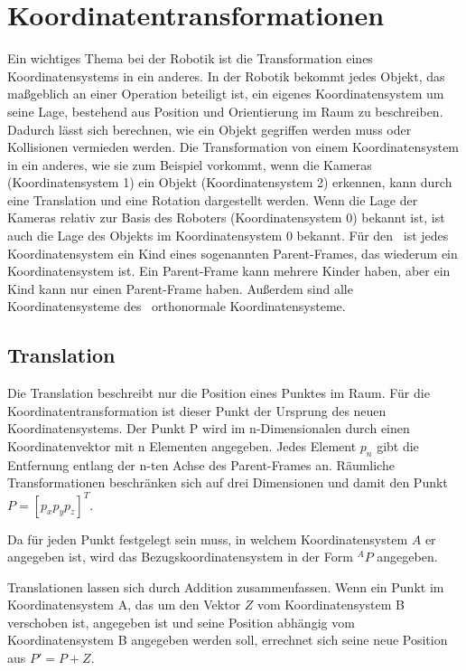 \section{Koordinatentransformationen}

Ein wichtiges Thema bei der Robotik ist die Transformation eines 
Koordinatensystems in ein anderes. In der Robotik bekommt jedes
Objekt, das maßgeblich an einer Operation beteiligt ist, ein eigenes
Koordinatensystem um seine Lage, bestehend aus Position und Orientierung
im Raum zu beschreiben. Dadurch lässt sich berechnen, wie ein Objekt gegriffen
werden muss oder Kollisionen vermieden werden. Die Transformation von einem 
Koordinatensystem in ein anderes, wie sie zum Beispiel vorkommt, wenn die 
Kameras (Koordinatensystem 1) ein Objekt (Koordinatensystem 2) erkennen, kann
durch eine Translation und eine Rotation dargestellt werden. Wenn die Lage der
Kameras relativ zur Basis des Roboters (Koordinatensystem 0) bekannt ist, ist
auch die Lage des Objekts im Koordinatensystem 0 bekannt. Für den \cob\ ist 
jedes Koordinatensystem ein Kind eines sogenannten Parent-Frames, das wiederum 
ein Koordinatensystem ist. Ein Parent-Frame kann mehrere Kinder haben, aber ein
Kind kann nur einen Parent-Frame haben. Außerdem sind alle Koordinatensysteme
des \cob\ orthonormale Koordinatensysteme. 

\subsection{Translation}
\label{sub:Translation}


Die Translation beschreibt nur die Position eines Punktes im Raum. Für die 
Koordinatentransformation ist dieser Punkt der Ursprung des neuen Koordinatensystems.
Der Punkt P wird im n-Dimensionalen durch einen Koordinatenvektor mit n 
Elementen angegeben. Jedes Element $p_n$ gibt die Entfernung
entlang der n-ten Achse des Parent-Frames an. Räumliche Transformationen beschränken sich auf drei Dimensionen
und damit den Punkt $P= [p_x p_y p_z]^T$.

Da für jeden Punkt festgelegt sein muss, in welchem Koordinatensystem $A$ er angegeben
ist, wird das Bezugskoordinatensystem in der Form $^AP$ angegeben.

Translationen lassen sich durch Addition zusammenfassen. Wenn ein Punkt im 
Koordinatensystem A, das um den Vektor $Z$ vom Koordinatensystem B verschoben ist,
angegeben
ist und seine Position abhängig vom Koordinatensystem B angegeben werden soll,
errechnet sich seine neue Position aus $P' = P + Z$.


